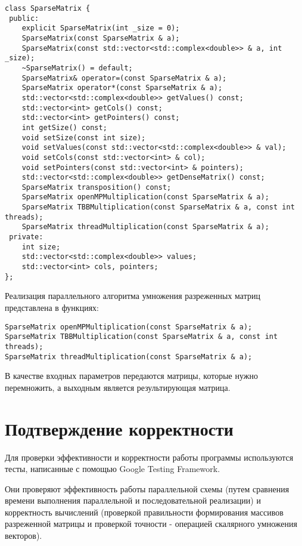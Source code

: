 \documentclass{report}
\begin{document}
\begin{lstlisting}
class SparseMatrix {
 public:
    explicit SparseMatrix(int _size = 0);
    SparseMatrix(const SparseMatrix & a);
    SparseMatrix(const std::vector<std::complex<double>> & a, int _size);
    ~SparseMatrix() = default;
    SparseMatrix& operator=(const SparseMatrix & a);
    SparseMatrix operator*(const SparseMatrix & a);
    std::vector<std::complex<double>> getValues() const;
    std::vector<int> getCols() const;
    std::vector<int> getPointers() const;
    int getSize() const;
    void setSize(const int size);
    void setValues(const std::vector<std::complex<double>> & val);
    void setCols(const std::vector<int> & col);
    void setPointers(const std::vector<int> & pointers);
    std::vector<std::complex<double>> getDenseMatrix() const;
    SparseMatrix transposition() const;
    SparseMatrix openMPMultiplication(const SparseMatrix & a);
    SparseMatrix TBBMultiplication(const SparseMatrix & a, const int threads);
    SparseMatrix threadMultiplication(const SparseMatrix & a);
 private:
    int size;
    std::vector<std::complex<double>> values;
    std::vector<int> cols, pointers;
};
\end{lstlisting}
\par Реализация параллельного алгоритма умножения разреженных матриц представлена в функциях:
\begin{lstlisting}
SparseMatrix openMPMultiplication(const SparseMatrix & a);
SparseMatrix TBBMultiplication(const SparseMatrix & a, const int threads);
SparseMatrix threadMultiplication(const SparseMatrix & a);
\end{lstlisting}
\par В качестве входных параметров передаются матрицы, которые нужно перемножить, а выходным является результирующая матрица.
\newpage

\section*{Подтверждение корректности}
Для проверки эффективности и корректности работы программы используются тесты, написанные с помощью Google Testing Framework.
\par Они проверяют эффективность работы параллельной схемы (путем сравнения времени выполнения параллельной и последовательной реализации) и корректность вычислений (проверкой правильности формирования массивов разреженной матрицы и проверкой точности - операцией скалярного умножения векторов).
\end{document}
